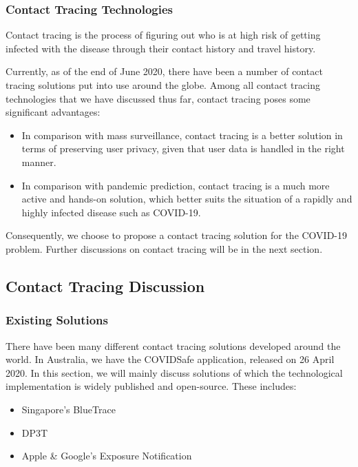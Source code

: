       \subsubsection{Contact Tracing Technologies}
        \par Contact tracing is the process of figuring out who is at high risk of getting infected with the disease through their contact history and travel history.
        \par Currently, as of the end of June 2020, there have been a number of contact tracing solutions put into use around the globe. Among all contact tracing technologies that we have discussed thus far, contact tracing poses some significant advantages:
        \begin{itemize}
          \item In comparison with mass surveillance, contact tracing is a better solution in terms of preserving user privacy, given that user data is handled in the right manner.
          \item In comparison with pandemic prediction, contact tracing is a much more active and hands-on solution, which better suits the situation of a rapidly and highly infected disease such as COVID-19.
        \end{itemize}
        \par Consequently, we choose to propose a contact tracing solution for the COVID-19 problem. Further discussions on contact tracing will be in the next section.

  \subsection{Contact Tracing Discussion}
    \subsubsection{Existing Solutions}
      \par There have been many different contact tracing solutions developed around the world. In Australia, we have the COVIDSafe application, released on 26 April 2020. In this section, we will mainly discuss solutions of which the technological implementation is widely published and open-source. These includes:
        \begin{itemize}
          \item Singapore’s BlueTrace
          \item DP3T
          \item Apple \& Google's Exposure Notification
        \end{itemize}
    
